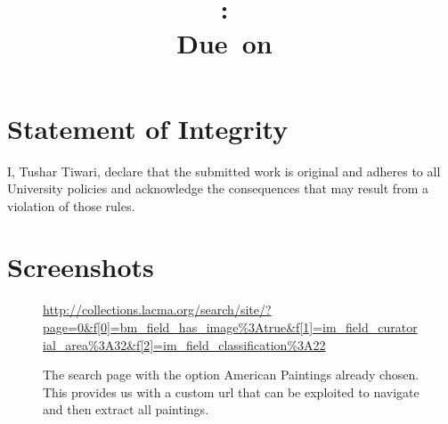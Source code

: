 \documentclass{article}
\title{
    \vspace{2in}
    \textmd{\textbf{\hmwkClass:\ \hmwkTitle}}\\
    \normalsize\vspace{0.1in}\small{Due\ on\ \hmwkDueDate}\\
    \vspace{0.1in}\large{\textit{\hmwkClassInstructor}}
    \vspace{3in}
}
\author{\textbf{\hmwkAuthorName}}
\date{}
\begin{document}
\maketitle

\pagebreak

\begin{flushleft}
\section{Statement of Integrity}
I, Tushar Tiwari, declare that the submitted work is original and adheres to all University policies and acknowledge the consequences that may result from a violation of those rules.
\section{Screenshots}
\begin{figure}[h]
\centering
{}
\urldef\myurl\url{http://collections.lacma.org/search/site/?page=0&f[0]=bm_field_has_image%3Atrue&f[1]=im_field_curatorial_area%3A32&f[2]=im_field_classification%3A22}
\caption{The search page with the option American Paintings already chosen. \\ This provides us with a custom url that can be exploited to navigate and then extract all paintings. \\ \myurl}
\end{figure}


\end{flushleft}
\end{document}
